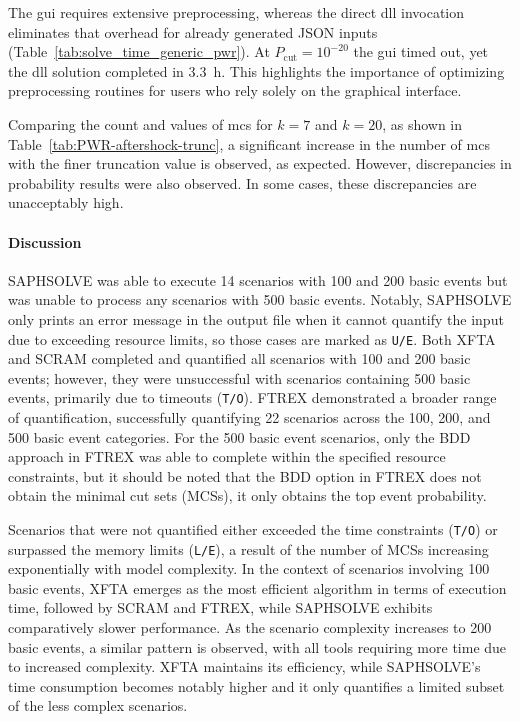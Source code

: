 

The \acrshort{gui} requires extensive preprocessing, whereas the direct \acrshort{dll} invocation eliminates that overhead for already generated JSON inputs (Table~\ref{tab:solve_time_generic_pwr}).  At $P_{\text{cut}}=10^{-20}$ the \acrshort{gui} timed out, yet the \acrshort{dll} solution completed in \SI{3.3}{h}.  This highlights the importance of optimizing preprocessing routines for users who rely solely on the graphical interface.

Comparing the count and values of \acrfull{mcs} for $k=7$ and $k=20$, as shown in Table~\ref{tab:PWR-aftershock-trunc}, a significant increase in the number of \acrshort{mcs} with the finer truncation value is observed, as expected. However, discrepancies in probability results were also observed. In some cases, these discrepancies are unacceptably high.



\paragraph{Discussion}

SAPHSOLVE was able to execute 14 scenarios with 100 and 200 basic events but was unable to process any scenarios with 500 basic events. Notably, SAPHSOLVE only prints an error message in the output file when it cannot quantify the input due to exceeding resource limits, so those cases are marked as \texttt{U/E}. Both XFTA and SCRAM completed and quantified all scenarios with 100 and 200 basic events; however, they were unsuccessful with scenarios containing 500 basic events, primarily due to timeouts (\texttt{T/O}). FTREX demonstrated a broader range of quantification, successfully quantifying 22 scenarios across the 100, 200, and 500 basic event categories. For the 500 basic event scenarios, only the BDD approach in FTREX was able to complete within the specified resource constraints, but it should be noted that the BDD option in FTREX does not obtain the minimal cut sets (MCSs), it only obtains the top event probability.

Scenarios that were not quantified either exceeded the time constraints (\texttt{T/O}) or surpassed the memory limits (\texttt{L/E}), a result of the number of MCSs increasing exponentially with model complexity. In the context of scenarios involving 100 basic events, XFTA emerges as the most efficient algorithm in terms of execution time, followed by SCRAM and FTREX, while SAPHSOLVE exhibits comparatively slower performance. As the scenario complexity increases to 200 basic events, a similar pattern is observed, with all tools requiring more time due to increased complexity. XFTA maintains its efficiency, while SAPHSOLVE's time consumption becomes notably higher and it only quantifies a limited subset of the less complex scenarios.

